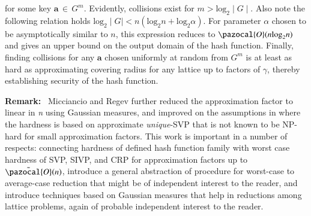 \documentclass[10pt]{elsarticle}
\begin{document}
for some key $\mathbf{a} \, \in \, G^{m}$. Evidently, collisions
exist for $m >\mbox{log}_{2}\mid G\mid$. Also note the following
relation holds $\mbox{log}_{2}\mid G\mid<n(\mbox{log}_{2}n+
\mbox{log}_{2}\alpha)$. For parameter $\alpha$ chosen to be
asymptotically similar to $n$, this expression reduces to
$\pazocal{O}(n\mbox{log}_{2}n)$ and gives an upper bound on the
output domain of the hash function. Finally, finding collisions for
any $\mathbf{a}$ chosen uniformly at random from $G^{m}$ is at least
as hard as approximating covering radius for any lattice up to
factors of $\gamma$, thereby establishing security of the hash
function.

\noindent\textbf{Remark:}~ Micciancio and Regev
\cite{CRHF_Micciancio2004} further reduced the approximation factor
to linear in \textit{n} using Gaussian measures, and improved on the
assumptions in \cite{CRHF_Regev} where the hardness is based on
approximate \textit{unique}-SVP that is not known to be NP-hard for
small approximation factors. This work is important in a number of
respects: connecting hardness of defined hash function family with
worst case hardness of SVP, SIVP, and CRP for approximation factors
up to $\Tilde{\pazocal{O}}(n)$, introduce a general abstraction of
procedure for worst-case to average-case reduction that might be of
independent interest to the reader, and introduce techniques based
on Gaussian measures that help in reductions among lattice problems,
again of probable independent interest to the reader.
\end{document}
